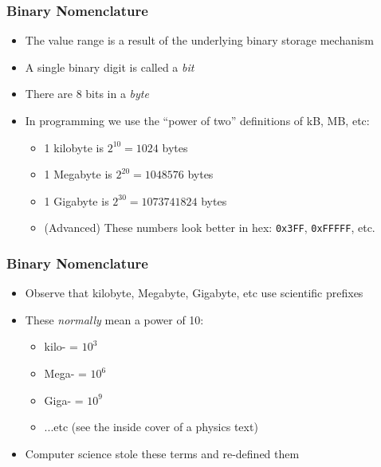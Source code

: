 \documentclass[14pt]{beamer}
\begin{document}
\begin{frame}
\frametitle{Binary Nomenclature}
\begin{itemize}
\item The value range is a result of the underlying binary storage mechanism
\item A single binary digit is called a \textit{bit}
\item There are 8 bits in a \textit{byte}
\item In programming we use the ``power of two'' definitions of kB, MB, etc:
	\begin{itemize}
		\item 1 kilobyte is $2^{10} = 1024$ bytes
		\item 1 Megabyte is $2^{20} = 1048576$ bytes
		\item 1 Gigabyte is $2^{30} = 1073741824$ bytes
		\item (Advanced) These numbers look better in hex: \texttt{0x3FF}, \texttt{0xFFFFF}, etc.
	\end{itemize}
\end{itemize}
\end{frame}

\begin{frame}
\frametitle{Binary Nomenclature}
\begin{itemize}
\item Observe that kilobyte, Megabyte, Gigabyte, etc use scientific prefixes
\item These \textit{normally} mean a power of 10:
	\begin{itemize}
		\item kilo- = $10^3$
		\item Mega- = $10^6$
		\item Giga- = $10^9$
		\item ...etc (see the inside cover of a physics text)
	\end{itemize}
\item Computer science stole these terms and re-defined them

\end{itemize}
\end{frame}
\end{document}
